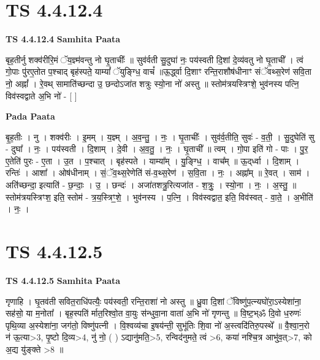 \documentclass[17pt]{extarticle}
\begin{document}

\section{ TS 4.4.12.4 }

\textbf{TS 4.4.12.4 } \newline
\textbf{Samhita Paata} \newline

बृह॒तीर्नु शक्व॑रीरि॒मं ॅय॒ज्ञ्म॑वन्तु नो घृ॒ताचीः᳚ ॥ सुव॑र्वती सु॒दुघा॑ नः॒ पय॑स्वती दि॒शां दे॒व्य॑वतु नो घृ॒ताची᳚ । त्वं गो॒पाः पु॑रए॒तोत प॒श्चाद् बृह॑स्पते॒ याम्यां᳚ ॅयुङ्ग्धि॒ वाचं᳚ ॥ऊ॒र्द्ध्वा दि॒शाꣳ रन्ति॒राशौष॑धीनाꣳ संॅवथ्स॒रेण॑ सवि॒ता नो॒ अह्नां᳚ । रे॒वथ् सामाति॑च्छन्दा उ॒ छन्दोऽजा॑त शत्रुः स्यो॒ना नो॑ अस्तु ॥ स्तोम॑त्रयस्त्रिꣳशे॒ भुव॑नस्य पत्नि॒ विव॑स्वद्वाते अ॒भि नो॑ - [  ] \newline

\textbf{Pada Paata} \newline

बृ॒ह॒तीः । नु । शक्व॑रीः । इ॒मम् । य॒ज्ञ्म् । अ॒व॒न्तु॒ । नः॒ । घृ॒ताचीः᳚ । सुव॑र्व॒तीति॒ सुवः॑ - व॒ती॒ । सु॒दुघेति॑ सु - दुघा᳚ । नः॒ । पय॑स्वती । दि॒शाम् । दे॒वी । अ॒व॒तु॒ । नः॒ । घृ॒ताची᳚ ॥ त्वम् । गो॒पा इति॑ गो - पाः । पु॒र॒ ए॒तेति॑ पुरः - ए॒ता । उ॒त । प॒श्चात् । बृह॑स्पते । याम्या᳚म् । यु॒ङ्ग्धि॒ । वाच᳚म् ॥ ऊ॒द्‌र्ध्वा । दि॒शाम् । रन्तिः॑ । आशा᳚ । ओष॑धीनाम् । सं॒ॅव॒थ्स॒रेणेति॑ सं-व॒थ्स॒रेण॑ । स॒वि॒ता । नः॒ । अह्ना᳚म् ॥ रे॒वत् । साम॑ । अति॑॑च्छन्दा॒ इत्याति॑ - छ॒न्दाः॒ । उ॒ । छन्दः॑ । अजा॑तशत्रु॒रित्यजा॑त - श॒त्रुः॒ । स्यो॒ना । नः॒ । अ॒स्तु॒ ॥ स्तोम॑त्रयस्त्रिꣳश॒ इति॒ स्तोम॑ - त्र॒य॒स्त्रिꣳ॒॒शे॒ । भुव॑नस्य । प॒त्नि॒ । विव॑स्वद्वात॒ इति॒ विव॑स्वत् - वा॒ते॒ । अ॒भीति॑ । नः॒ ।  \newline





\section{ TS 4.4.12.5 }

\textbf{TS 4.4.12.5 } \newline
\textbf{Samhita Paata} \newline

गृणाहि । घृ॒तव॑ती सवित॒राधि॑पत्यैः॒ पय॑स्वती॒ रन्ति॒राशा॑ नो अस्तु ॥ ध्रु॒वा दि॒शां ॅविष्णु॑प॒त्न्यघो॑रा॒ऽस्येशा॑ना॒ सह॑सो॒ या म॒नोता᳚ । बृह॒स्पति॑ र्मात॒रिश्वो॒त वा॒युः स॑न्धुवा॒ना वाता॑ अ॒भि नो॑ गृणन्तु ॥ वि॒ष्ट॒भ्ॐ दि॒वो ध॒रुणः॑ पृथि॒व्या अ॒स्येशा॑ना॒ जग॑तो॒ विष्णु॑पत्नी । वि॒श्वव्य॑चा इ॒षय॑न्ती॒ सुभू॑तिः शि॒वा नो॑ अ॒स्त्वदि॑तिरु॒पस्थे᳚ ॥ वै॒श्वा॒न॒रो न॑ ऊ॒त्या>3, पृ॒ष्टो दि॒व्य>4, नु॑ नो॒ ( ) ऽद्यानु॑मति॒>5, रन्विद॑नुमते॒ त्वं >6, कया॑ नश्चि॒त्र आभु॑व॒त्>7, को अ॒द्य यु॑ङ्क्ते >8 ॥ \newline
\end{document}
